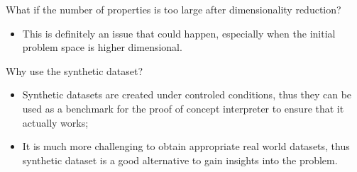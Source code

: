 \documentclass[10pt]{beamer}
\begin{document}
\begin{frame}

\begin{alertblock}{What if the number of properties is too large after dimensionality reduction?}
\begin{itemize}
\item This is definitely an issue that could happen, especially when the initial problem space is higher dimensional.
\end{itemize}
\end{alertblock}

\end{frame}

\begin{frame}

\begin{alertblock}{Why use the synthetic dataset?}
\begin{itemize}
\item Synthetic datasets are created under controled conditions, thus they can be used as a benchmark for the proof of concept interpreter to ensure that it actually works;
\item It is much more challenging to obtain appropriate real world datasets, thus synthetic dataset is a good alternative to gain insights into the problem.
\end{itemize}
\end{alertblock}

\end{frame}
\end{document}
